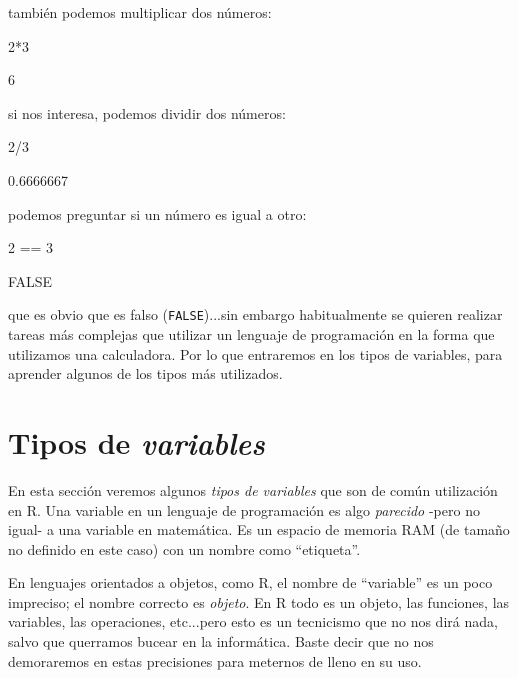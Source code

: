 \documentclass[11pt,a4paper]{article}
\begin{document}
\noindent también podemos multiplicar dos números:
\begin{Schunk}
\begin{Sinput}
 2*3
\end{Sinput}
\begin{Soutput}
[1] 6
\end{Soutput}
\end{Schunk}

\noindent si nos interesa, podemos dividir dos números:

\begin{Schunk}
\begin{Sinput}
 2/3
\end{Sinput}
\begin{Soutput}
[1] 0.6666667
\end{Soutput}
\end{Schunk}

\noindent podemos preguntar si un número es igual a otro:

\begin{Schunk}
\begin{Sinput}
 2 == 3
\end{Sinput}
\begin{Soutput}
[1] FALSE
\end{Soutput}
\end{Schunk}

\noindent que es obvio que es falso (\texttt{FALSE})...sin embargo habitualmente se quieren realizar tareas más complejas que utilizar un lenguaje de programación en la forma que utilizamos una calculadora. Por lo que entraremos en los tipos de variables, para aprender algunos de los tipos más utilizados.



\section{Tipos de \textit{variables}}

En esta sección veremos algunos \textit{tipos de variables} que son de común utilización en R. Una variable en un lenguaje de programación es algo \textit{parecido} -pero no igual- a una variable en matemática. Es un espacio de memoria RAM (de tamaño no definido en este caso) con un nombre como ``etiqueta''.

En lenguajes orientados a objetos, como R, el nombre de ``variable'' es un poco  impreciso; el nombre correcto es \textit{objeto}. En R todo es un objeto, las funciones, las variables, las operaciones, etc...pero esto es un tecnicismo que no nos dirá nada, salvo que querramos bucear en la informática. Baste decir que no nos demoraremos en estas precisiones para meternos de lleno en su uso.
\end{document}
